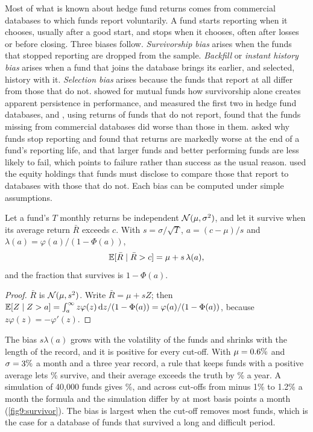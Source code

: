 \begin{chapterrefs}
Most of what is known about hedge fund returns comes from commercial databases to which funds report
voluntarily. A fund starts reporting when it chooses, usually after a good start, and stops when it
chooses, often after losses or before closing. Three biases follow. \emph{Survivorship bias} arises when
the funds that stopped reporting are dropped from the sample. \emph{Backfill} or \emph{instant history bias}
arises when a fund that joins the database brings its earlier, and selected, history with it.
\emph{Selection bias} arises because the funds that report at all differ from those that do not.
\textcite{brown1992} showed for mutual funds how survivorship alone creates apparent persistence
in performance, \textcite{fung2000} and \textcite{liang2000} measured the first two in hedge fund
databases, and \textcite{aiken2013}, using returns of funds that do not report, found that the
funds missing from commercial databases did worse than those in them. \textcite{grecu2007} asked why funds
stop reporting and found that returns are markedly worse at the end of a fund's reporting life, and that
larger funds and better performing funds are less likely to fail, which points to failure rather than
success as the usual reason. \textcite{agarwal2013} used the equity holdings that funds
must disclose to compare those that report to databases with those that do not. Each bias can be computed under simple assumptions.

\begin{proposition}\label{prop9:survivor}
Let a fund's $T$ monthly returns be independent $\mathcal{N}(\mu,\sigma^2)$, and let it survive when its average
return $\bar R$ exceeds $c$. With $s=\sigma/\sqrt T$, $a=(c-\mu)/s$ and $\lambda(a)=\varphi(a)/(1-\Phi(a))$,
\begin{equation}\label{eq9:survivor}
  \mathbb{E}[\bar R\mid\bar R>c] = \mu + s\,\lambda(a),
\end{equation}
and the fraction that survives is $1-\Phi(a)$.
\end{proposition}

\begin{proof}
$\bar R$ is $\mathcal{N}(\mu,s^2)$. Write $\bar R=\mu+sZ$; then $\mathbb{E}[Z\mid Z>a]=\int_a^\infty z\varphi(z)\,\mathrm{d} z/(1-\Phi(a))
=\varphi(a)/(1-\Phi(a))$, because $z\varphi(z)=-\varphi'(z)$.
\end{proof}

The bias $s\lambda(a)$ grows with the volatility of the funds and shrinks with the length of the
record, and it is positive for every cut-off. With $\mu=0.6\%$ and $\sigma=3\%$ a month and a
three year record, a rule that keeps funds with a positive average lets \svShareZero\% survive, and
their average exceeds the truth by \svBiasZeroTh\% a year. A simulation of 40,000 funds gives
\svBiasZero\%, and across cut-offs from minus 1\% to 1.2\% a month the formula and the simulation differ
by at most \svMaxGap{} basis points a month (\cref{fig9:survivor}). The bias is largest when the cut-off
removes most funds, which is the case for a database of funds that survived a long and difficult period.


\end{chapterrefs}
